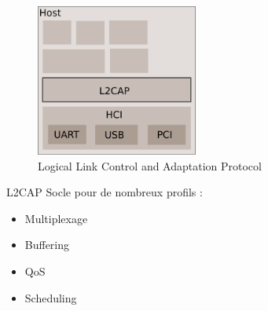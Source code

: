 \begin{frame}
	\begin{minipage}[t]{0.60\linewidth}
		\begin{figure}
			\includegraphics[height=5cm]{img/arch_log_l2cap.png}
			\caption{Logical Link Control and Adaptation Protocol}
		\end{figure}
	\end{minipage}
	\begin{minipage}[t]{0.30\linewidth}
		\begin{block}{L2CAP}
			Socle pour de nombreux profils :
			\begin{itemize}
				\item Multiplexage
				\item Buffering
				\item QoS
				\item Scheduling
			\end{itemize}
		\end{block}
	\end{minipage}
\end{frame}

